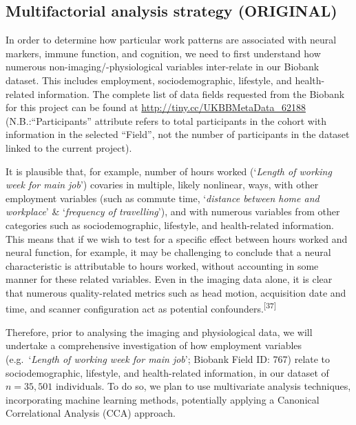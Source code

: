 \documentclass[
  english,
  man, donotrepeattitle]{apa6}
\begin{document}
\newpage

\hypertarget{multifactorial-analysis-strategy-original}{%
\subsection{Multifactorial analysis strategy (ORIGINAL)}\label{multifactorial-analysis-strategy-original}}

In order to determine how particular work patterns are associated with neural markers, immune function, and cognition, we need to first understand how numerous non-imaging/-physiological variables inter-relate in our Biobank dataset. This includes employment, sociodemographic, lifestyle, and health-related information. The complete list of data fields requested from the Biobank for this project can be found at \url{http://tiny.cc/UKBBMetaData_62188} (N.B.:``Participants'' attribute refers to total participants in the cohort with information in the selected ``Field'', not the number of participants in the dataset linked to the current project).

It is plausible that, for example, number of hours worked (`\emph{Length of working week for main job}') covaries in multiple, likely nonlinear, ways, with other employment variables (such as commute time, `\emph{distance between home and workplace}' \& `\emph{frequency of travelling}'), and with numerous variables from other categories such as sociodemographic, lifestyle, and health-related information. This means that if we wish to test for a specific effect between hours worked and neural function, for example, it may be challenging to conclude that a neural characteristic is attributable to hours worked, without accounting in some manner for these related variables. Even in the imaging data alone, it is clear that numerous quality-related metrics such as head motion, acquisition date and time, and scanner configuration act as potential confounders.\textsuperscript{{[}37{]}}

Therefore, prior to analysing the imaging and physiological data, we will undertake a comprehensive investigation of how employment variables (e.g.~`\emph{Length of working week for main job}'; Biobank Field ID: 767) relate to sociodemographic, lifestyle, and health-related information, in our dataset of \(n=35,501\) individuals. To do so, we plan to use multivariate analysis techniques, incorporating machine learning methods, potentially applying a Canonical Correlational Analysis (CCA) approach.
\end{document}
